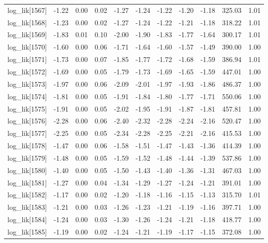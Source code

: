 \begin{table}[ht]
\begin{tabular}{rrrrrrrrrrr}
  log\_lik[1567] & -1.22 & 0.00 & 0.02 & -1.27 & -1.24 & -1.22 & -1.20 & -1.18 & 325.03 & 1.01 \\ 
  log\_lik[1568] & -1.23 & 0.00 & 0.02 & -1.27 & -1.24 & -1.22 & -1.21 & -1.18 & 318.22 & 1.01 \\ 
  log\_lik[1569] & -1.83 & 0.01 & 0.10 & -2.00 & -1.90 & -1.83 & -1.77 & -1.64 & 300.17 & 1.01 \\ 
  log\_lik[1570] & -1.60 & 0.00 & 0.06 & -1.71 & -1.64 & -1.60 & -1.57 & -1.49 & 390.00 & 1.00 \\ 
  log\_lik[1571] & -1.73 & 0.00 & 0.07 & -1.85 & -1.77 & -1.72 & -1.68 & -1.59 & 386.94 & 1.01 \\ 
  log\_lik[1572] & -1.69 & 0.00 & 0.05 & -1.79 & -1.73 & -1.69 & -1.65 & -1.59 & 447.01 & 1.00 \\ 
  log\_lik[1573] & -1.97 & 0.00 & 0.06 & -2.09 & -2.01 & -1.97 & -1.93 & -1.86 & 486.37 & 1.00 \\ 
  log\_lik[1574] & -1.81 & 0.00 & 0.05 & -1.91 & -1.84 & -1.80 & -1.77 & -1.71 & 550.06 & 1.00 \\ 
  log\_lik[1575] & -1.91 & 0.00 & 0.05 & -2.02 & -1.95 & -1.91 & -1.87 & -1.81 & 457.81 & 1.00 \\ 
  log\_lik[1576] & -2.28 & 0.00 & 0.06 & -2.40 & -2.32 & -2.28 & -2.24 & -2.16 & 520.47 & 1.00 \\ 
  log\_lik[1577] & -2.25 & 0.00 & 0.05 & -2.34 & -2.28 & -2.25 & -2.21 & -2.16 & 415.53 & 1.00 \\ 
  log\_lik[1578] & -1.47 & 0.00 & 0.06 & -1.58 & -1.51 & -1.47 & -1.43 & -1.36 & 414.39 & 1.00 \\ 
  log\_lik[1579] & -1.48 & 0.00 & 0.05 & -1.59 & -1.52 & -1.48 & -1.44 & -1.39 & 537.86 & 1.00 \\ 
  log\_lik[1580] & -1.40 & 0.00 & 0.05 & -1.50 & -1.43 & -1.40 & -1.36 & -1.31 & 467.03 & 1.00 \\ 
  log\_lik[1581] & -1.27 & 0.00 & 0.04 & -1.34 & -1.29 & -1.27 & -1.24 & -1.21 & 391.01 & 1.00 \\ 
  log\_lik[1582] & -1.17 & 0.00 & 0.02 & -1.20 & -1.18 & -1.16 & -1.15 & -1.13 & 315.70 & 1.01 \\ 
  log\_lik[1583] & -1.21 & 0.00 & 0.03 & -1.26 & -1.23 & -1.21 & -1.19 & -1.16 & 397.71 & 1.00 \\ 
  log\_lik[1584] & -1.24 & 0.00 & 0.03 & -1.30 & -1.26 & -1.24 & -1.21 & -1.18 & 418.77 & 1.00 \\ 
  log\_lik[1585] & -1.19 & 0.00 & 0.02 & -1.24 & -1.21 & -1.19 & -1.17 & -1.15 & 372.08 & 1.00 \\ 

\end{tabular}
\end{table}

